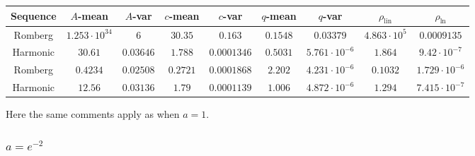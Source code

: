 \begin{table}[H]
    \centering
    \small
    \begin{tabular}{c||c|c|c|c|c|c|c|c}
Sequence & \(A\)-mean & \(A\)-var & \(c\)-mean & \(c\)-var & \(q\)-mean & \(q\)-var & \(\rho_{\operatorname{lin}}\) & \(\rho_{\ln}\)\\\hline
\rowcolor{red}
Romberg & \(1.253\cdot 10^{34}\) & \(6\) & \(30.35\) & \(0.163\) & \(0.1548\) & \(0.03379\) & \(4.863\cdot 10^5\) & \(0.0009135\) \\
\rowcolor{green}
Harmonic & \(30.61\) & \(0.03646\) & \(1.788\) & \(0.0001346\) & \(0.5031\) & \(5.761\cdot 10^{-6}\) & \(1.864\) & \(9.42\cdot 10^{-7}\) \\
\rowcolor{green}
Romberg & \(0.4234\) & \(0.02508\) & \(0.2721\) & \(0.0001868\) & \(2.202\) & \(4.231\cdot 10^{-6}\) & \(0.1032\) & \(1.729\cdot 10^{-6}\) \\
\rowcolor{green}
Harmonic & \(12.56\) & \(0.03136\) & \(1.79\) & \(0.0001139\) & \(1.006\) & \(4.872\cdot 10^{-6}\) & \(1.294\) & \(7.415\cdot 10^{-7}\) \\
    \end{tabular}
    \label{tab:my_label}
\end{table}

Here the same comments apply as when \(a = 1\).

\subsubsection{\(a = e^{-2}\)}

